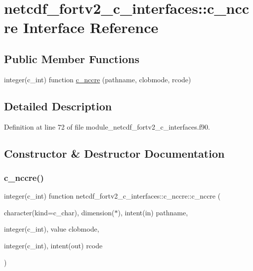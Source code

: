 \hypertarget{interfacenetcdf__fortv2__c__interfaces_1_1c__nccre}{}\section{netcdf\+\_\+fortv2\+\_\+c\+\_\+interfaces\+:\+:c\+\_\+nccre Interface Reference}
\label{interfacenetcdf__fortv2__c__interfaces_1_1c__nccre}
\subsection*{Public Member Functions}
\begin{DoxyCompactItemize}
\item 
integer(c\+\_\+int) function \hyperlink{interfacenetcdf__fortv2__c__interfaces_1_1c__nccre_ae9115a0dd52df42914bd05e820a92891}{c\+\_\+nccre} (pathname, clobmode, rcode)
\end{DoxyCompactItemize}


\subsection{Detailed Description}


Definition at line 72 of file module\+\_\+netcdf\+\_\+fortv2\+\_\+c\+\_\+interfaces.\+f90.



\subsection{Constructor \& Destructor Documentation}
\mbox{\label{interfacenetcdf__fortv2__c__interfaces_1_1c__nccre_ae9115a0dd52df42914bd05e820a92891}} 
\subsubsection{\texorpdfstring{c\+\_\+nccre()}{c\_nccre()}}
{\footnotesize\ttfamily integer(c\+\_\+int) function netcdf\+\_\+fortv2\+\_\+c\+\_\+interfaces\+::c\+\_\+nccre\+::c\+\_\+nccre (\begin{DoxyParamCaption}\item[{character(kind=c\+\_\+char), dimension($\ast$), intent(in)}]{pathname,  }\item[{integer(c\+\_\+int), value}]{clobmode,  }\item[{integer(c\+\_\+int), intent(out)}]{rcode }\end{DoxyParamCaption})}



